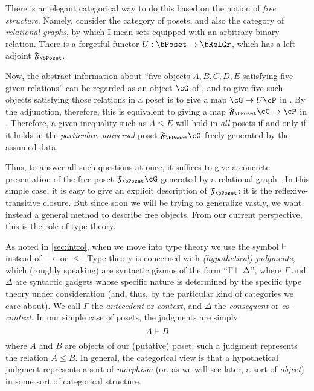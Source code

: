 There is an elegant categorical way to do this based on the notion of \emph{free structure}.
Namely, consider the category \bPoset of posets, and also the category \bRelGr of \emph{relational graphs}, by which I mean sets equipped with an arbitrary binary relation.
There is a forgetful functor $U:\bPoset \to \bRelGr$, which has a left adjoint $\F\bPoset$.

Now, the abstract information about ``five objects $A,B,C,D,E$ satisfying five given relations'' can be regarded as an object $\cG$ of \bRelGr, and to give five such objects satisfying those relations in a poset \cP is to give a map $\cG \to U\cP$ in \bRelGr.
By the adjunction, therefore, this is equivalent to giving a map $\F\bPoset\cG \to \cP$ in \bPoset.
Therefore, a given inequality such as $A\le E$ will hold in \emph{all} posets if and only if it holds in the \emph{particular, universal} poset $\F\bPoset\cG$ freely generated by the assumed data.

Thus, to answer all such questions at once, it suffices to give a concrete presentation of the free poset $\F\bPoset\cG$ generated by a relational graph \cG.
In this simple case, it is easy to give an explicit description of $\F\bPoset$: it is the reflexive-transitive closure.
But since soon we will be trying to generalize vastly, we want instead a general method to describe free objects.
From our current perspective, this is the role of type theory.

As noted in \cref{sec:intro}, when we move into type theory we use the symbol $\vdash$ instead of $\to$ or $\le$.
Type theory is concerned with \emph{(hypothetical) judgments}, which (roughly speaking) are syntactic gizmos of the form ``$\Gamma\vdash\Delta$'', where $\Gamma$ and $\Delta$ are syntactic gadgets whose specific nature is determined by the specific type theory under consideration (and, thus, by the particular kind of categories we care about).
We call $\Gamma$ the \emph{antecedent} or \emph{context}, and $\Delta$ the \emph{consequent} or \emph{co-context}.
In our simple case of posets, the judgments are simply
\[ A \vdash B \]
where $A$ and $B$ are objects of our (putative) poset; such a judgment represents the relation $A\le B$.
In general, the categorical view is that a hypothetical judgment represents a sort of \emph{morphism} (or, as we will see later, a sort of \emph{object}) in some sort of categorical structure.

